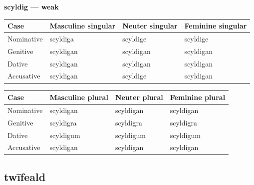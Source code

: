 \textbf{scyldig — weak}

\par\begingroup
\fontsize{10.5}{13.2}\selectfont
\setlength{\LTleft}{0pt}\setlength{\LTright}{\fill}
\noindent
\begin{tabular}{@{}>{\raggedright\arraybackslash}p{22.0mm}>{\raggedright\arraybackslash}p{31.188mm}>{\raggedright\arraybackslash}p{31.188mm}>{\raggedright\arraybackslash}p{31.188mm}@{}}
\toprule
\textbf{Case} & \textbf{Masculine singular} & \textbf{Neuter singular} & \textbf{Feminine singular} \\
\midrule
Nominative & scyldiga & scyldige & scyldige \\
Genitive & scyldigan & scyldigan & scyldigan \\
Dative & scyldigan & scyldigan & scyldigan \\
Accusative & scyldigan & scyldige & scyldigan \\
\bottomrule
\end{tabular}
\par\endgroup
\par\addvspace{5pt}
\par\begingroup
\fontsize{10.5}{13.2}\selectfont
\setlength{\LTleft}{0pt}\setlength{\LTright}{\fill}
\noindent
\begin{tabular}{@{}>{\raggedright\arraybackslash}p{22.0mm}>{\raggedright\arraybackslash}p{31.188mm}>{\raggedright\arraybackslash}p{31.188mm}>{\raggedright\arraybackslash}p{31.188mm}@{}}
\toprule
\textbf{Case} & \textbf{Masculine plural} & \textbf{Neuter plural} & \textbf{Feminine plural} \\
\midrule
Nominative & scyldigan & scyldigan & scyldigan \\
Genitive & scyldigra & scyldigra & scyldigra \\
Dative & scyldigum & scyldigum & scyldigum \\
Accusative & scyldigan & scyldigan & scyldigan \\
\bottomrule
\end{tabular}
\par\endgroup

\subsection*{twīfeald}

